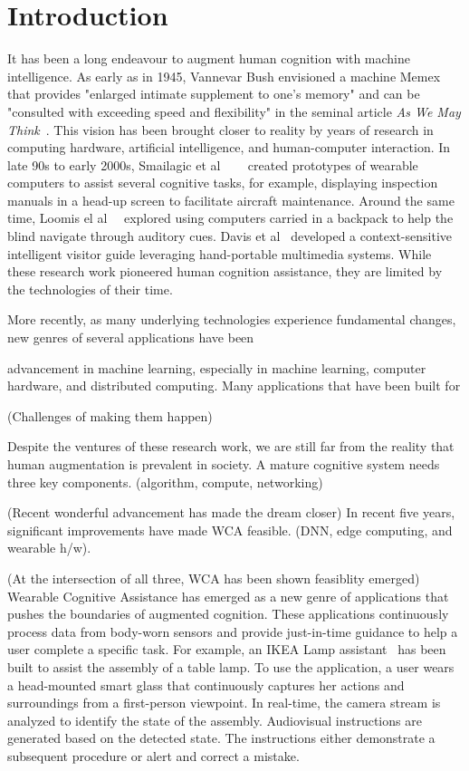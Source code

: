 \chapter{Introduction}

It has been a long endeavour to augment human cognition with machine
intelligence. As early as in 1945, Vannevar Bush envisioned a machine Memex that
provides "enlarged intimate supplement to one's memory" and can be "consulted
with exceeding speed and flexibility" in the seminal article \textit{As We May
Think}~\cite{bush1945we}. This vision has been brought closer to reality by years
of research in computing hardware, artificial intelligence, and human-computer
interaction. In late 90s to early 2000s, Smailagic et al
~\cite{smailagic1993case}~\cite{smailagic1998very}~\cite{smailagic2002application}
created prototypes of wearable computers to assist several cognitive tasks, for
example, displaying inspection manuals in a head-up screen to facilitate
aircraft maintenance. Around the same time, Loomis el
al~\cite{loomis1998navigation}~\cite{loomis1994personal} explored using
computers carried in a backpack to help the blind navigate through auditory
cues. Davis et al~\cite{davies1998developing} developed a context-sensitive
intelligent visitor guide leveraging hand-portable multimedia systems. While
these research work pioneered human cognition assistance, they are limited by
the technologies of their time.

More recently, as many underlying technologies experience fundamental changes,
new genres of several applications have been 

advancement in machine learning, especially in machine
learning, computer hardware, and distributed computing. Many applications that
have been built for

(Challenges of making them happen)

Despite the ventures of these research work, we are still far from the reality
that human augmentation is prevalent in society. A mature cognitive system needs
three key components. (algorithm, compute, networking)

(Recent wonderful advancement has made the dream closer)
In recent five years, significant improvements have made WCA feasible. (DNN,
edge computing, and wearable h/w).

(At the intersection of all three, WCA has been shown feasiblity emerged)
Wearable Cognitive Assistance has emerged as a new genre of applications that
pushes the boundaries of augmented cognition. These applications continuously
process data from body-worn sensors and provide just-in-time guidance to help a
user complete a specific task. For example, an IKEA Lamp
assistant~\cite{chen2018application} has been built to assist the assembly of a
table lamp. To use the application, a user wears a head-mounted smart glass that
continuously captures her actions and surroundings from a first-person
viewpoint. In real-time, the camera stream is analyzed to identify the state of
the assembly. Audiovisual instructions are generated based on the detected
state. The instructions either demonstrate a subsequent procedure or alert and
correct a mistake.

